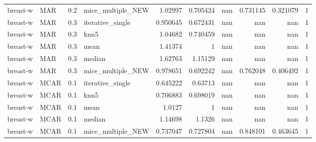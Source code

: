 \begin{table}[ht]
\begin{tabular}{llrlrrrrrr}
 breast-w        & MAR         &         0.2 & mice\_multiple\_NEW &       1.02997  &             0.705424 &            nan         &                         0.731145 &                      0.321079  &         1 \\
 breast-w        & MAR         &         0.3 & iterative\_single  &       0.950645 &             0.672431 &            nan         &                       nan        &                    nan         &         1 \\
 breast-w        & MAR         &         0.3 & knn5              &       1.04682  &             0.740459 &            nan         &                       nan        &                    nan         &         1 \\
 breast-w        & MAR         &         0.3 & mean              &       1.41374  &             1        &            nan         &                       nan        &                    nan         &         1 \\
 breast-w        & MAR         &         0.3 & median            &       1.62763  &             1.15129  &            nan         &                       nan        &                    nan         &         1 \\
 breast-w        & MAR         &         0.3 & mice\_multiple\_NEW &       0.978651 &             0.692242 &            nan         &                         0.762048 &                      0.406492  &         1 \\
 breast-w        & MCAR        &         0.1 & iterative\_single  &       0.645222 &             0.63713  &            nan         &                       nan        &                    nan         &         1 \\
 breast-w        & MCAR        &         0.1 & knn5              &       0.706883 &             0.698019 &            nan         &                       nan        &                    nan         &         1 \\
 breast-w        & MCAR        &         0.1 & mean              &       1.0127   &             1        &            nan         &                       nan        &                    nan         &         1 \\
 breast-w        & MCAR        &         0.1 & median            &       1.14698  &             1.1326   &            nan         &                       nan        &                    nan         &         1 \\
 breast-w        & MCAR        &         0.1 & mice\_multiple\_NEW &       0.737047 &             0.727804 &            nan         &                         0.848101 &                      0.463645  &         1 \\

\end{tabular}
\end{table}
